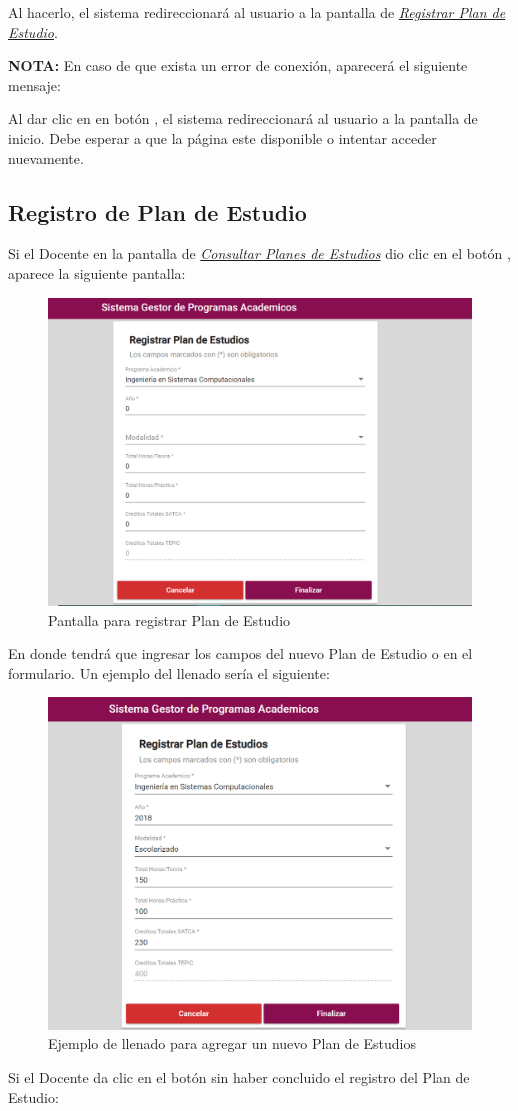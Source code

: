Al hacerlo, el sistema redireccionará al usuario a la pantalla de \hyperlink{registrarPE}{\textit{Registrar Plan de Estudio}}.


\textbf{NOTA:} En caso de que exista un error de conexión, aparecerá el siguiente mensaje:

Al dar clic en en botón , el sistema redireccionará al usuario a la pantalla de inicio. Debe esperar a que la página este disponible o intentar acceder nuevamente.
\newpage
\subsection{Registro de Plan de Estudio}
Si el Docente en la pantalla de \hyperlink{consultarPE}{\textit{Consultar Planes de Estudios}} dio clic en el botón \IUbutton{+}, aparece la siguiente pantalla:

\begin{figure}[!hbtp]
    \centering
    \hypertarget{registrarPE}{\includegraphics[width=0.7\linewidth]{images/SP4-GPE/registrarPE}}
    \caption{Pantalla para registrar Plan de Estudio}
    \label{registrarPE}
\end{figure}
\newpage
En donde tendrá que ingresar los campos del nuevo Plan de Estudio o en el formulario. Un ejemplo del llenado sería el siguiente:

\begin{figure}[!hbtp]
    \centering
    \hypertarget{ejreg}{\includegraphics[width=0.7\linewidth]{images/SP4-GPE/registrarEjem}}
    \caption{Ejemplo de llenado para agregar un nuevo Plan de Estudios}
    \label{ejreg}
\end{figure}
\newpage
Si el Docente  da clic en el botón  sin haber concluido el registro del Plan de Estudio:

